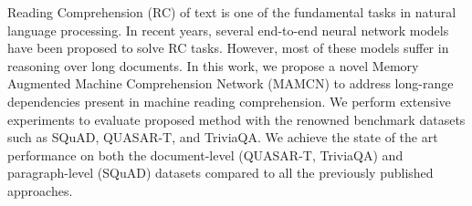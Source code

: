 Reading Comprehension (RC) of text is one of the fundamental tasks in natural language processing. In recent years, several end-to-end neural network models have been proposed to solve RC tasks. However, most of these models suffer in reasoning over long documents. In this work, we propose a novel Memory Augmented Machine Comprehension Network (MAMCN) to address long-range dependencies present in machine reading comprehension. We perform extensive experiments to evaluate proposed method with the renowned benchmark datasets such as SQuAD, QUASAR-T, and TriviaQA. We achieve the state of the art performance on both the document-level (QUASAR-T, TriviaQA) and paragraph-level (SQuAD) datasets compared to all the previously published approaches.
